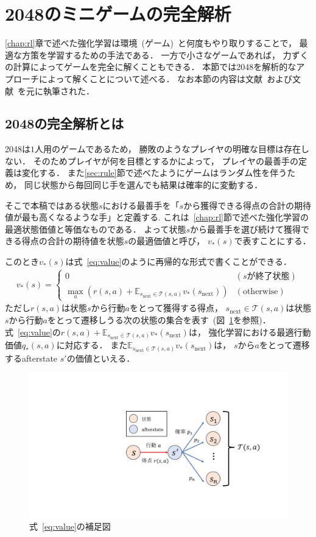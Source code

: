 \section{2048のミニゲームの完全解析}
\label{chap:solving}
\ref{chap:rl}章で述べた強化学習は環境~(ゲーム)~と何度もやり取りすることで， 最適な方策を学習するための手法である．
一方で小さなゲームであれば， 力ずくの計算によってゲームを完全に解くこともできる．
本節では2048を解析的なアプローチによって解くことについて述べる．
なお本節の内容は文献~\cite{3x3_2048}および文献~\cite{4x3_2048}を元に執筆された．

\subsection{2048の完全解析とは}
\label{sec:solving}
2048は$1$人用のゲームであるため， 勝敗のようなプレイヤの明確な目標は存在しない．
そのためプレイヤが何を目標とするかによって， プレイヤの最善手の定義は変化する．
また\ref{sec:rule}節で述べたようにゲームはランダム性を伴うため， 同じ状態から毎回同じ手を選んでも結果は確率的に変動する．

そこで本稿ではある状態$s$における最善手を「$s$から獲得できる得点の合計の期待値が最も高くなるような手」と定義する.
これは~\ref{chap:rl}節で述べた強化学習の最適状態価値と等価なものである．
よって状態$s$から最善手を選び続けて獲得できる得点の合計の期待値を状態$s$の最適価値と呼び， $v_*(s)$で表すことにする．

このとき$v_*(s)$は式~\ref{eq:value}のように再帰的な形式で書くことができる．
\begin{align}
    v_*(s) =
    \begin{cases}
        0 & (s \text{が終了状態}) \\
        \max_a \left(r(s,a) + \mathbb{E}_{s_\text{next} \in \mathcal{T}(s,a)} v_*(s_\text{next}) \right) & (\text{otherwise})
    \end{cases}
    \label{eq:value}
\end{align}
ただし$r(s,a)$は状態$s$から行動$a$をとって獲得する得点， $s_\text{next} \in \mathcal{T}(s,a)$は状態$s$から行動$a$をとって遷移しうる次の状態の集合を表す~(図~\ref{fig:state_afterstate}を参照)．
式~\ref{eq:value}の$r(s,a) + \mathbb{E}_{s_\text{next} \in \mathcal{T}(s,a)} v_*(s_\text{next})$は， 強化学習における最適行動価値$q_*(s,a)$に対応する．
また$\mathbb{E}_{s_\text{next} \in \mathcal{T}(s,a)} v_*(s_\text{next})$は， $s$から$a$をとって遷移するafterstate $s'$の価値といえる．

\begin{figure}[t]
    \centering
    \includegraphics[width=0.6\linewidth{}]{figures/value_function_.pdf}
    \caption{式~\ref{eq:value}の補足図}
    \label{fig:state_afterstate}
\end{figure}

